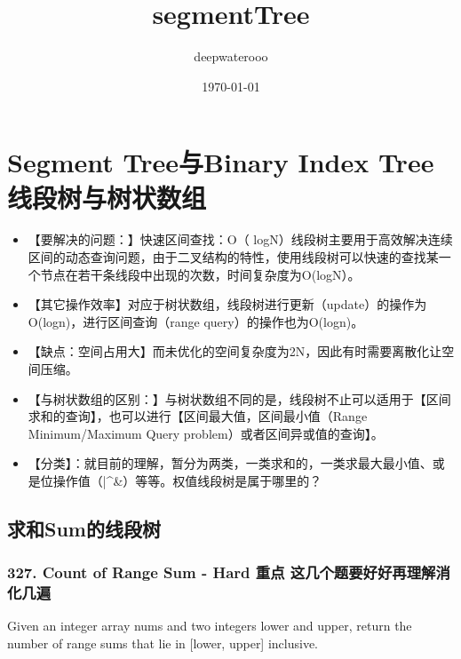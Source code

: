 \documentclass[9pt, b5paaper]{book}
\author{deepwaterooo}
\date{\today}
\title{segmentTree}
\begin{document}
\maketitle
\tableofcontents


\chapter{Segment Tree与Binary Index Tree 线段树与树状数组}
\label{sec-1}
\begin{itemize}
\item 【要解决的问题：】快速区间查找：O（ logN）线段树主要用于高效解决连续区间的动态查询问题，由于二叉结构的特性，使用线段树可以快速的查找某一个节点在若干条线段中出现的次数，时间复杂度为O(logN）。
\item 【其它操作效率】对应于树状数组，线段树进行更新（update）的操作为O(logn)，进行区间查询（range query）的操作也为O(logn)。
\item 【缺点：空间占用大】而未优化的空间复杂度为2N，因此有时需要离散化让空间压缩。
\item 【与树状数组的区别：】与树状数组不同的是，线段树不止可以适用于【区间求和的查询】，也可以进行【区间最大值，区间最小值（Range Minimum/Maximum Query problem）或者区间异或值的查询】。
\item 【分类】：就目前的理解，暂分为两类，一类求和的，一类求最大最小值、或是位操作值（|\^{}\&）等等。权值线段树是属于哪里的？
\end{itemize}
\section{求和Sum的线段树}
\label{sec-1-1}
\subsection{327. Count of Range Sum - Hard \textbf{重点} 这几个题要好好再理解消化几遍}
\label{sec-1-1-1}
Given an integer array nums and two integers lower and upper, return the number of range sums that lie in [lower, upper] inclusive.
\end{document}
